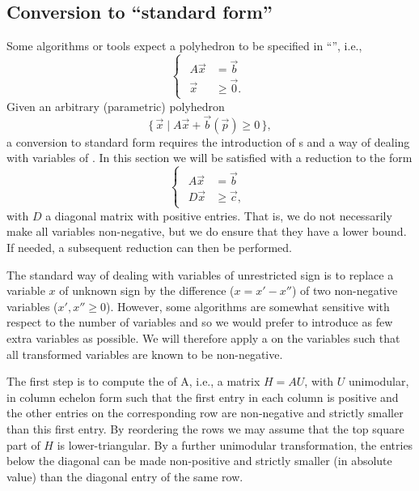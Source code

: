 \subsection{Conversion to ``standard form''}
\label{s:standard}

Some algorithms or tools expect a polyhedron to be
specified in ``'', i.e.,
\begin{equation}
\label{eq:standard}
\begin{cases}
    \begin{aligned}
A \vec x & = \vec b \\
\vec x & \ge \vec 0
.
    \end{aligned}
\end{cases}
\end{equation}
Given an arbitrary (parametric) polyhedron
\begin{equation}
\label{eq:non-standard}
\{\,
\vec x \mid
A \vec x + \vec b(\vec p) \ge 0
\,\}
,
\end{equation}
a conversion to standard form requires the introduction
of s and a way of dealing with variables
of .
In this section we will be satisfied with a reduction
to the form
\begin{equation}
\label{eq:standard:2}
\begin{cases}
    \begin{aligned}
A \vec x & = \vec b \\
D \vec x & \ge \vec c
,
    \end{aligned}
\end{cases}
\end{equation}
with $D$ a diagonal matrix with positive entries.
That is, we do not necessarily make all variables non-negative,
but we do ensure that they have a lower bound.
If needed, a subsequent reduction can then be performed.

The standard way of dealing with variables of unrestricted
sign is to replace a variable $x$ of unknown sign by the
difference ($x = x' - x''$) of two non-negative variables
($x', x'' \ge 0$).
However, some algorithms are somewhat sensitive with respect
to the number of variables and so we would prefer to introduce
as few extra variables as possible.
We will therefore apply a 
on the variables such that all transformed variables are known
to be non-negative.

The first step is to compute the  of A,
i.e., a matrix $H = A U$, with $U$ unimodular,
in column echelon form such that the
first entry in each column is positive and the other entries
on the corresponding row are non-negative and strictly smaller
than this first entry.
By reordering the rows we may assume that the top square part
of $H$ is lower-triangular.
By a further unimodular transformation, the entries
below the diagonal can be made non-positive and strictly
smaller (in absolute value) than the diagonal entry of the same row.

